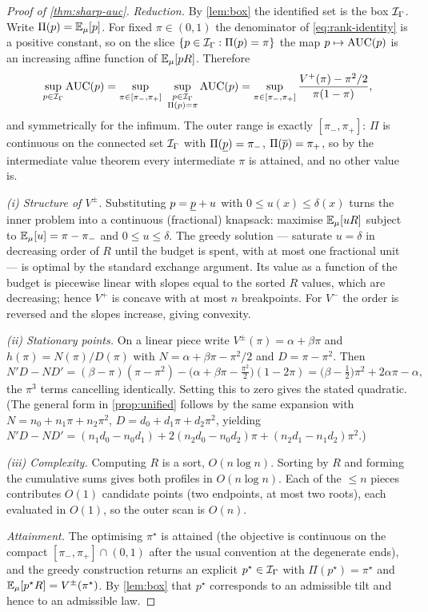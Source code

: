 \begin{proof}[Proof of \cref{thm:sharp-auc}]
\emph{Reduction.} By \cref{lem:box} the identified set is the box $\mathcal{I}_\Gamma$.
Write $\Pi(p)=\mathbb{E}_\mu[p]$. For fixed $\pi\in(0,1)$ the denominator of
\eqref{eq:rank-identity} is a positive constant, so on the slice
$\{p\in\mathcal{I}_\Gamma : \Pi(p)=\pi\}$ the map $p\mapsto\operatorname{AUC}(p)$ is an increasing
affine function of $\mathbb{E}_\mu[pR]$. Therefore
\[
  \sup_{p\in\mathcal{I}_\Gamma}\operatorname{AUC}(p)
  = \sup_{\pi\in[\pi_-,\pi_+]}\ \sup_{\substack{p\in\mathcal{I}_\Gamma\\ \Pi(p)=\pi}}\operatorname{AUC}(p)
  = \sup_{\pi\in[\pi_-,\pi_+]}\frac{V^{+}(\pi)-\pi^2/2}{\pi(1-\pi)},
\]
and symmetrically for the infimum. The outer range is exactly $[\pi_-,\pi_+]$:
$\Pi$ is continuous on the connected set $\mathcal{I}_\Gamma$ with
$\Pi(\underline{p})=\pi_-$, $\Pi(\overline{p})=\pi_+$, so by the intermediate value theorem every
intermediate $\pi$ is attained, and no other value is.

\emph{(i) Structure of $V^{\pm}$.} Substituting $p=\underline{p} + u$ with
$0\le u(x)\le \delta(x)$ turns the inner problem into a continuous
(fractional) knapsack: maximise $\mathbb{E}_\mu[uR]$ subject to $\mathbb{E}_\mu[u]=\pi-\pi_-$ and
$0\le u\le\delta$. The greedy solution --- saturate $u=\delta$ in decreasing
order of $R$ until the budget is spent, with at most one fractional unit ---
is optimal by the standard exchange argument. Its value as a function of the
budget is piecewise linear with slopes equal to the sorted $R$ values, which are
decreasing; hence $V^{+}$ is concave with at most $n$ breakpoints. For
$V^{-}$ the order is reversed and the slopes increase, giving convexity.

\emph{(ii) Stationary points.} On a linear piece write
$V^{\pm}(\pi)=\alpha+\beta\pi$ and $h(\pi)=N(\pi)/D(\pi)$ with
$N=\alpha+\beta\pi-\pi^2/2$ and $D=\pi-\pi^2$. Then
\[
  N'D-ND'
  = (\beta-\pi)(\pi-\pi^2) - \big(\alpha+\beta\pi-\tfrac{\pi^2}{2}\big)(1-2\pi)
  = \big(\beta-\tfrac12\big)\pi^{2} + 2\alpha\pi - \alpha,
\]
the $\pi^3$ terms cancelling identically. Setting this to zero gives the stated
quadratic. (The general form in \cref{prop:unified} follows by the same
expansion with $N=n_0+n_1\pi+n_2\pi^2$, $D=d_0+d_1\pi+d_2\pi^2$, yielding
$N'D-ND' = (n_1d_0-n_0d_1) + 2(n_2d_0-n_0d_2)\pi + (n_2d_1-n_1d_2)\pi^2$.)

\emph{(iii) Complexity.} Computing $R$ is a sort, $O(n\log n)$. Sorting by $R$
and forming the cumulative sums gives both profiles in $O(n\log n)$. Each of the
$\le n$ pieces contributes $O(1)$ candidate points (two endpoints, at most two
roots), each evaluated in $O(1)$, so the outer scan is $O(n)$.

\emph{Attainment.} The optimising $\pi^\star$ is attained (the objective is
continuous on the compact $[\pi_-,\pi_+]\cap(0,1)$ after the usual convention at
the degenerate ends), and the greedy construction returns an explicit
$p^\star\in\mathcal{I}_\Gamma$ with $\Pi(p^\star)=\pi^\star$ and
$\mathbb{E}_\mu[p^\star R]=V^{\pm}(\pi^\star)$. By \cref{lem:box} that $p^\star$
corresponds to an admissible tilt and hence to an admissible law.
\end{proof}

